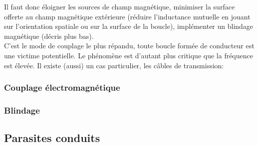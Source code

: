 Il faut donc éloigner les sources de champ magnétique, minimiser la surface offerte au champ magnétique extérieure (réduire l'inductance mutuelle en jouant sur l'orientation spatiale ou sur la surface de la boucle), implémenter un blindage magnétique (décris plus bas).\\
C'est le mode de couplage le plus répandu, toute boucle formée de conducteur est une victime potentielle. Le phénomène est d'autant plus critique que la fréquence est élevée. Il existe (aussi) un cas particulier, les câbles de transmission:
\subsubsection{Couplage électromagnétique}

\subsubsection{Blindage}

\subsection{Parasites conduits}